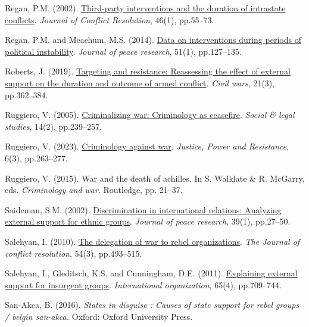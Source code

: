 \documentclass[
]{article}
\newlength{\cslhangindent}
\newenvironment{CSLReferences}[2] %
 {\begin{list}{}{%
  \setlength{\itemindent}{0pt}
  \setlength{\leftmargin}{0pt}
  \setlength{\parsep}{0pt}
  \ifodd #1
   \setlength{\leftmargin}{\cslhangindent}
   \setlength{\itemindent}{-1\cslhangindent}
  \fi
  \setlength{\itemsep}{#2\baselineskip}}}
 {\end{list}}
\begin{document}
\begin{CSLReferences}{0}{1}
Regan, P.M. (2002).
\href{https://doi.org/10.1177/0022002702046001004}{Third-party
interventions and the duration of intrastate conflicts}. \emph{Journal
of Conflict Resolution}, 46(1), pp.55--73.

Regan, P.M. and Meachum, M.S. (2014).
\href{https://doi.org/10.1177/0022343313505303}{Data on interventions
during periods of political instability}. \emph{Journal of peace
research}, 51(1), pp.127--135.

Roberts, J. (2019).
\href{https://doi.org/10.1080/13698249.2019.1648631}{Targeting and
resistance: Reassessing the effect of external support on the duration
and outcome of armed conflict}. \emph{Civil wars}, 21(3), pp.362--384.

Ruggiero, V. (2005).
\href{https://doi.org/10.1177/0964663905051221}{Criminalizing war:
Criminology as ceasefire}. \emph{Social \& legal studies}, 14(2),
pp.239--257.

Ruggiero, V. (2023). \href{https://doi.org/10.1332/TGBW8348}{Criminology
against war}. \emph{Justice, Power and Resistance}, 6(3), pp.263--277.

Ruggiero, V. (2015). War and the death of achilles. In S. Walklate \& R.
McGarry, eds. \emph{Criminology and war}. Routledge, pp. 21--37.

Saideman, S.M. (2002).
\href{https://doi.org/10.1177/0022343302039001002}{Discrimination in
international relations: Analyzing external support for ethnic groups}.
\emph{Journal of peace research}, 39(1), pp.27--50.

Salehyan, I. (2010). \href{https://doi.org/10.1177/0022002709357890}{The
delegation of war to rebel organizations}. \emph{The Journal of conflict
resolution}, 54(3), pp.493--515.

Salehyan, I., Gleditsch, K.S. and Cunningham, D.E. (2011).
\href{https://doi.org/10.1017/S0020818311000233}{Explaining external
support for insurgent groups}. \emph{International organization}, 65(4),
pp.709--744.

San-Akca, B. (2016). \emph{States in disguise : Causes of state support
for rebel groups / belgin san-akca.} Oxford: Oxford University Press.


\end{CSLReferences}
\end{document}
